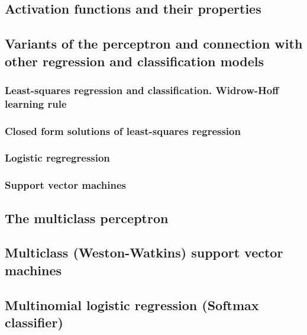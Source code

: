 \subsection{Activation functions and their properties}
\subsection{Variants of the perceptron and 
    connection with other regression and classification models}

\subsubsection{Least-squares regression and classification. Widrow-Hoff learning rule}
\subsubsection{Closed form solutions of least-squares regression}
\subsubsection{Logistic regregression}
\subsubsection{Support vector machines}

\subsection{The multiclass perceptron}
\subsection{Multiclass (Weston-Watkins) support vector machines}
\subsection{Multinomial logistic regression (Softmax classifier)}
